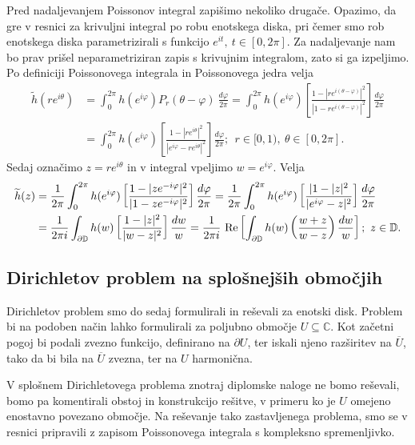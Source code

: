 \documentclass[mat1, tisk]{fmfdelo}
\begin{document}
    Pred nadaljevanjem Poissonov integral zapišimo nekoliko drugače. Opazimo, da gre v resnici za krivuljni integral po robu enotskega diska, pri čemer smo rob enotskega diska parametrizirali s funkcijo $e^{it},~t \in [0,2 \pi]$. 
    Za nadaljevanje nam bo prav prišel neparametriziran zapis s krivujnim integralom, zato si ga izpeljimo. Po definiciji Poissonovega integrala in Poissonovega jedra velja
    \begin{align*}
        \widetilde{h}(r e^{i\theta}) &= \int_{0}^{2\pi}{h(e^{i\varphi}) P_r(\theta - \varphi)~\frac{d\varphi}{2 \pi}} = \int_{0}^{2\pi}{h(e^{i\varphi}) \left[\frac{1 - |r e^{i (\theta - \varphi)}|^2}{|1 - r e^{i (\theta - \varphi)}|^2}\right]\frac{d\varphi}{2 \pi}} \\
        & = \int_{0}^{2\pi}{h(e^{i\varphi}) \left[\frac{1 - |r e^{i \theta}|^2}{|e^{i \varphi} - r e^{i \theta}|^2}\right]\frac{d\varphi}{2 \pi}};~~ r \in [0,1),~\theta \in [0,2 \pi].
    \end{align*}
    Sedaj označimo $z = re^{i \theta}$ in v integral vpeljimo $w = e^{i \varphi}$. Velja
    \begin{align}
        \label{pi_kompl}
        \widetilde{h}(z) &= \frac{1}{2 \pi}\int_{0}^{2\pi}{h(e^{i\varphi}) \left[\frac{1 - |ze^{ -i\varphi}|^2}{|1 - ze^{-i\varphi}|^2}\right]\frac{d\varphi}{2 \pi}}= \frac{1}{2\pi}\int_{0}^{2\pi}{h(e^{i\varphi}) \left[\frac{|1 - |z|^2}{|e^{i \varphi} - z|^2}\right]\frac{d\varphi}{2 \pi}} \notag \\
        & = \frac{1}{2\pi i}\int_{\partial \mathbb{D}}{h(w) \left[\frac{1 - |z|^2}{|w - z|^2}\right]\frac{dw}{w}} =  \frac{1}{2\pi i}~\text{Re}\left[\int_{\partial \mathbb{D}}{h(w) \left(\frac{w + z }{w - z}\right)\frac{dw}{w}}\right];~ z \in \mathbb{D}.
    \end{align}

\subsection{Dirichletov problem na splošnejših območjih}
    Dirichletov problem smo do sedaj formulirali in reševali za enotski disk. Problem bi na podoben način lahko formulirali za poljubno območje $U \subseteq \mathbb{C}$. 
    Kot začetni pogoj bi podali zvezno funkcijo, definirano na $\partial U$, ter iskali njeno razširitev na $\overline{U}$, tako da bi bila na $\overline{U}$ zvezna, ter na $U$ harmonična.
    
    V splošnem Dirichletovega problema znotraj diplomske naloge ne bomo reševali, bomo pa komentirali obstoj in konstrukcijo rešitve, v primeru ko je $U$ omejeno enostavno povezano območje.
    Na reševanje tako zastavljenega problema, smo se v resnici pripravili z zapisom Poissonovega integrala s kompleksno spremenljivko.
\end{document}
